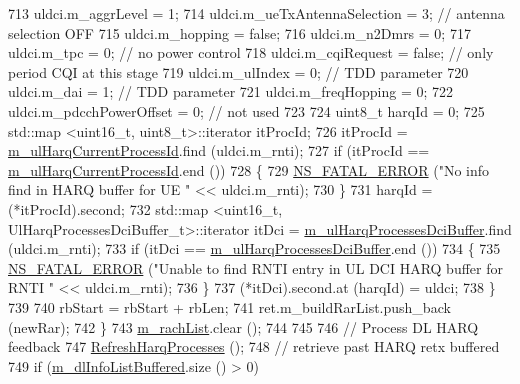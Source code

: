 \begin{DoxyCode}
713           uldci.m\_aggrLevel = 1;
714           uldci.m\_ueTxAntennaSelection = 3; \textcolor{comment}{// antenna selection OFF}
715           uldci.m\_hopping = \textcolor{keyword}{false};
716           uldci.m\_n2Dmrs = 0;
717           uldci.m\_tpc = 0; \textcolor{comment}{// no power control}
718           uldci.m\_cqiRequest = \textcolor{keyword}{false}; \textcolor{comment}{// only period CQI at this stage}
719           uldci.m\_ulIndex = 0; \textcolor{comment}{// TDD parameter}
720           uldci.m\_dai = 1; \textcolor{comment}{// TDD parameter}
721           uldci.m\_freqHopping = 0;
722           uldci.m\_pdcchPowerOffset = 0; \textcolor{comment}{// not used}
723 
724           uint8\_t harqId = 0;
725           std::map <uint16\_t, uint8\_t>::iterator itProcId;
726           itProcId = \hyperlink{classns3_1_1TtaFfMacScheduler_af8bd1675d63b73c0374a39180e1cbf54}{m\_ulHarqCurrentProcessId}.find (uldci.m\_rnti);
727           \textcolor{keywordflow}{if} (itProcId == \hyperlink{classns3_1_1TtaFfMacScheduler_af8bd1675d63b73c0374a39180e1cbf54}{m\_ulHarqCurrentProcessId}.end ())
728             \{
729               \hyperlink{group__fatal_ga5131d5e3f75d7d4cbfd706ac456fdc85}{NS\_FATAL\_ERROR} (\textcolor{stringliteral}{"No info find in HARQ buffer for UE "} << uldci.m\_rnti);
730             \}
731           harqId = (*itProcId).second;
732           std::map <uint16\_t, UlHarqProcessesDciBuffer\_t>::iterator itDci = 
      \hyperlink{classns3_1_1TtaFfMacScheduler_a9ead4d91174d42d6995978358c08689e}{m\_ulHarqProcessesDciBuffer}.find (uldci.m\_rnti);
733           \textcolor{keywordflow}{if} (itDci == \hyperlink{classns3_1_1TtaFfMacScheduler_a9ead4d91174d42d6995978358c08689e}{m\_ulHarqProcessesDciBuffer}.end ())
734             \{
735               \hyperlink{group__fatal_ga5131d5e3f75d7d4cbfd706ac456fdc85}{NS\_FATAL\_ERROR} (\textcolor{stringliteral}{"Unable to find RNTI entry in UL DCI HARQ buffer for RNTI "} << 
      uldci.m\_rnti);
736             \}
737           (*itDci).second.at (harqId) = uldci;
738         \}
739 
740       rbStart = rbStart + rbLen;
741       ret.m\_buildRarList.push\_back (newRar);
742     \}
743   \hyperlink{classns3_1_1TtaFfMacScheduler_ac2f848953754daa546155b20aa1d9ace}{m\_rachList}.clear ();
744 
745 
746   \textcolor{comment}{// Process DL HARQ feedback}
747   \hyperlink{classns3_1_1TtaFfMacScheduler_a0d70dd3503e3a8743cca82852aa35e7e}{RefreshHarqProcesses} ();
748   \textcolor{comment}{// retrieve past HARQ retx buffered}
749   \textcolor{keywordflow}{if} (\hyperlink{classns3_1_1TtaFfMacScheduler_af7afa3d5a610456175b21bad17cc04ae}{m\_dlInfoListBuffered}.size () > 0)

\end{DoxyCode}
